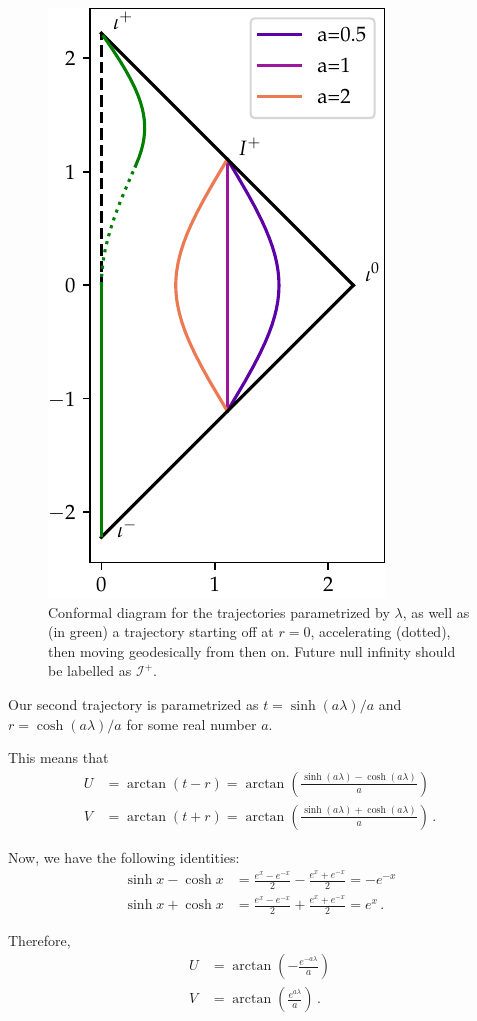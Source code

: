 \documentclass[main.tex]{subfiles}
\begin{document}
\begin{figure}[ht]
\centering
\includegraphics[width=.5\textwidth]{figures/conformal_trajectory}
\caption{Conformal diagram for the trajectories parametrized by \(\lambda \), as well as (in green) a trajectory starting off at \(r = 0\), accelerating (dotted), then moving geodesically from then on.
Future null infinity should be labelled as \(\mathscr{I}^+\). 
}
\label{fig:conformal_trajectory}
\end{figure}

Our second trajectory is parametrized as \(t = \sinh(a \lambda ) / a\) and \(r = \cosh(a \lambda ) / a\) 
for some real number \(a\).

This means that %
\begin{align}
U &= \arctan(t-r) = \arctan(\frac{\sinh(a \lambda ) - \cosh(a \lambda )}{a})  \\
V &= \arctan(t+r) = \arctan(\frac{\sinh(a \lambda ) + \cosh(a \lambda )}{a})
\,.
\end{align}

Now, we have the following identities: %
\begin{align}
\sinh x - \cosh x &= \frac{e^x - e^{-x}}{2} - \frac{e^x + e^{-x}}{2} = - e^{-x}  \\
\sinh x + \cosh x &= \frac{e^x - e^{-x}}{2} + \frac{e^x + e^{-x}}{2} = e^{x}  
\,.
\end{align}

Therefore, %
\begin{align}
U &= \arctan(- \frac{e^{-a \lambda }}{a}) \\
V &= \arctan(\frac{e^{a \lambda }}{a})
\,.
\end{align}
\end{document}
